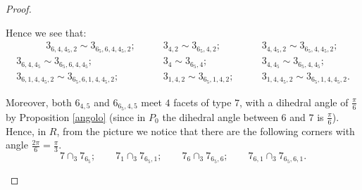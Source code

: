 \documentclass{amsart}
\theoremstyle{definition}
\theoremstyle{remark}
\begin{document}
\begin{proof}
\begin{itemize}


        Hence we see that:
        \begin{align*}
            \quad \quad \quad 3_{6,4,4_5,2} \sim 3_{6_5,6,4,4_5,2}; \quad \quad
            & 3_{4,2} \sim 3_{6_5,4,2}; \quad \quad
            & 3_{4,4_5,2} \sim 3_{6_5,4,4_5,2}; \\
            3_{6,4,4_5} \sim 3_{6_5,6,4,4_5}; \quad \quad
            & 3_{4} \sim 3_{6_5,4}; \quad \quad
            & 3_{4,4_5} \sim 3_{6_5,4,4_5}; \\
            3_{6,1,4,4_5,2} \sim 3_{6_5,6,1,4,4_5,2}; \quad \quad
            & 3_{1,4,2} \sim 3_{6_5,1,4,2}; \quad \quad 
            & 3_{1,4,4_5,2} \sim 3_{6_5,1,4,4_5,2}.
        \end{align*}
        

        Moreover, both $6_{4,5}$ and $6_{6_5,4,5}$ meet $4$ facets of type $7$, with a dihedral angle of $\frac{\pi}{6}$ by Proposition \ref{angolo} (since in $P_0$ the dihedral angle between $6$ and $7$ is $\frac{\pi}{6}$). 
        Hence, in $R$, from the picture we notice that there are the following corners with angle $\frac{2\pi}{6}=\frac{\pi}{3}$.
        $$
            7 \cap_3 7_{6_5}; \quad \quad
             7_1 \cap_3 7_{6_5,1}; \quad \quad
             7_6 \cap_3 7_{6_5,6}; \quad \quad
             7_{6,1} \cap_3 7_{6_5,6,1}.
        $$


\end{itemize}
\end{proof}
\end{document}
